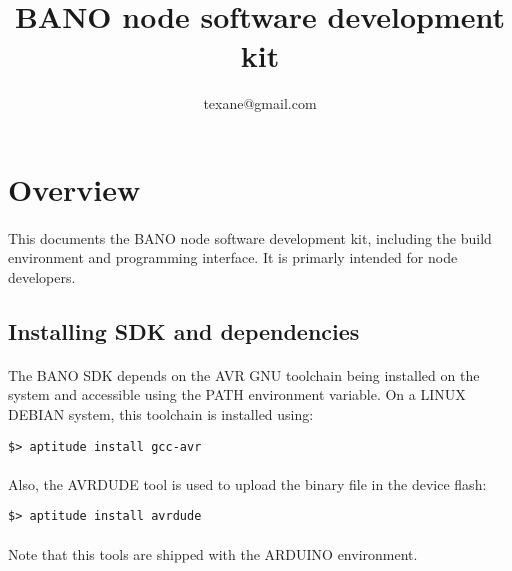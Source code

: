 \documentclass[a4paper, 11pt]{article}
\begin{document}
\title{BANO node software development kit}
\author{texane@gmail.com}
\date{}

\maketitle



\clearpage
\section{Overview}

\paragraph{}
This documents the BANO node software development kit, including
the build environment and programming interface. It is primarly
intended for node developers.

\subsection{Installing SDK and dependencies}

\paragraph{}
The BANO SDK depends on the AVR GNU toolchain being installed on
the system and accessible using the PATH environment variable.
On a LINUX DEBIAN system, this toolchain is installed using:
\begin{scriptsize}
\begin{verbatim}
$> aptitude install gcc-avr
\end{verbatim}
\end{scriptsize}

\paragraph{}
Also, the AVRDUDE tool is used to upload the binary file in the
device flash:
\begin{scriptsize}
\begin{verbatim}
$> aptitude install avrdude
\end{verbatim}
\end{scriptsize}

\paragraph{}
Note that this tools are shipped with the ARDUINO environment.
\end{document}
